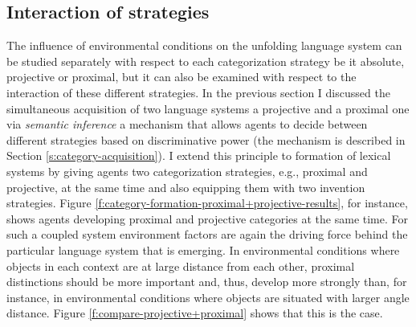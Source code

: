 \subsection{Interaction of strategies}
The influence of environmental conditions on the unfolding language system 
can be studied separately with respect to each categorization strategy be
it absolute, projective or proximal, but it can also be examined with respect
to the interaction of these different strategies. In the previous section 
I discussed the simultaneous acquisition of two language systems a projective and
a proximal one via \emph{semantic inference} a mechanism
that allows agents to decide between different strategies based on discriminative power
(the mechanism is described in Section \ref{s:category-acquisition}). 
I extend this principle to formation of lexical systems by giving agents 
two categorization strategies, e.g., proximal and projective, at the same time 
and also equipping them with two invention strategies. 
Figure \ref{f:category-formation-proximal+projective-results}, for instance, 
shows agents developing proximal and projective categories at the same time. 
For such a coupled system environment factors are again the driving force behind 
the particular language system that is emerging. In environmental conditions where
objects in each context are at large distance from each other, proximal distinctions
should be more important and, thus, develop more strongly than, for instance, 
in environmental conditions where objects are situated with larger angle distance. 
Figure \ref{f:compare-projective+proximal} shows that this is the case.

